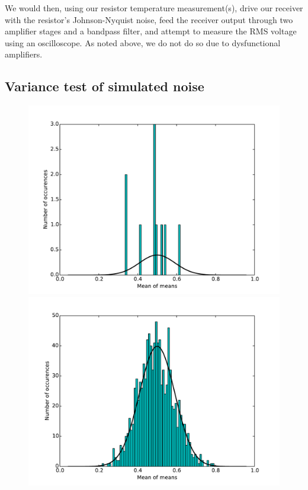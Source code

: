 \documentclass[11pt]{article}
\begin{document}
We would then, using our resistor temperature measurement(s), drive our
receiver with the resistor's Johnson-Nyquist noise, feed the receiver output
through two amplifier stages and a bandpass filter, and attempt to measure the
RMS voltage using an oscilloscope.  As noted above, we do not do so due to
dysfunctional amplifiers.

\subsection{Variance test of simulated noise}

\begin{figure}[h]
    \centering
    \includegraphics[scale=0.25]{scripts/hist_normal_m=10_n=10.pdf}
    \includegraphics[scale=0.25]{scripts/hist_normal_m=10_n=1000.pdf}

\end{figure}
\end{document}
